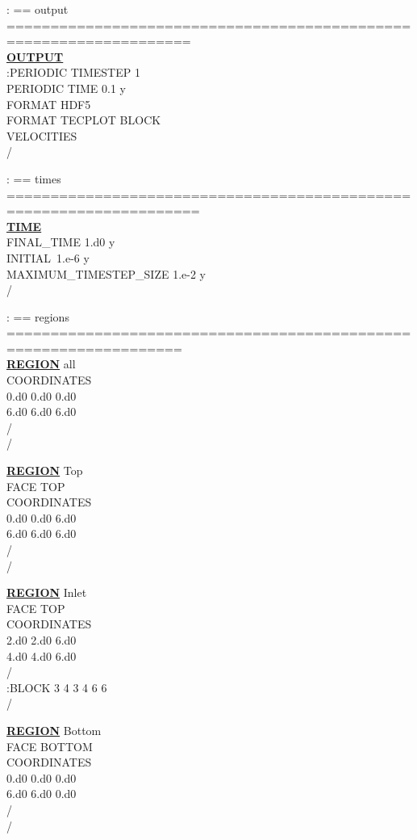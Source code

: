\documentclass[12pt]{article}
\begin{document}
\noindent
: == output ===================================================================\\
\hyperlink{target_output}{\bf OUTPUT}\\
:PERIODIC TIMESTEP 1\\
PERIODIC TIME 0.1 y\\
FORMAT HDF5\\
FORMAT TECPLOT BLOCK\\
VELOCITIES\\
/

\noindent
: == times ====================================================================\\
\hyperlink{target_time}{\bf TIME}\\
FINAL\_TIME 1.d0 y\\
INITIAL\ 1.e-6 y\\
MAXIMUM\_TIMESTEP\_SIZE 1.e-2 y\\
/

\noindent
: == regions ==================================================================\\
\hyperlink{target_region}{\bf REGION} all\\
COORDINATES\\
0.d0 0.d0 0.d0\\
6.d0 6.d0 6.d0\\
/\\
/

\noindent
\hyperlink{target_region}{\bf REGION} Top\\
FACE TOP\\
COORDINATES\\
0.d0 0.d0 6.d0\\
6.d0 6.d0 6.d0\\
/\\
/

\noindent
\hyperlink{target_region}{\bf REGION} Inlet\\
FACE TOP\\
COORDINATES\\
2.d0 2.d0 6.d0\\
4.d0 4.d0 6.d0\\
/\\
:BLOCK 3 4 3 4 6 6\\
/

\noindent
\hyperlink{target_region}{\bf REGION} Bottom\\
FACE BOTTOM\\
COORDINATES\\
0.d0 0.d0 0.d0\\
6.d0 6.d0 0.d0\\
/\\
/
\end{document}
